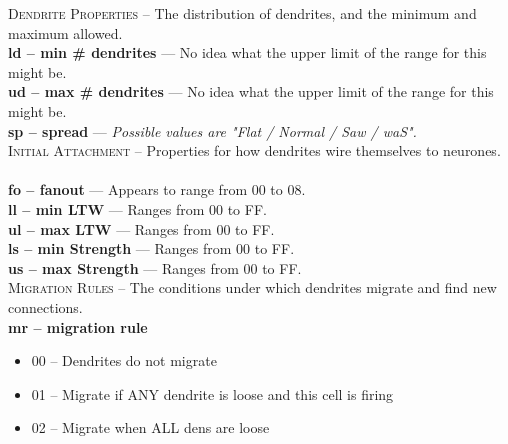 \documentclass[11pt,twoside,a4paper]{article}
\begin{document}
\textsc{Dendrite Properties} -- The distribution of dendrites, and the minimum and maximum allowed. ~\\

\textbf{ld -- min \# dendrites} --- No idea what the upper limit of the range for this might be. ~\\

\textbf{ud -- max \# dendrites} --- No idea what the upper limit of the range for this might be. ~\\

\textbf{sp -- spread} --- \emph{Possible values are "Flat / Normal / Saw / waS". } ~\\

\textsc{Initial Attachment} -- Properties for how dendrites wire themselves to neurones. ~\\

\textbf{fo -- fanout} --- Appears to range from 00 to 08. ~\\

\textbf{ll -- min LTW} --- Ranges from 00 to FF. ~\\

\textbf{ul -- max LTW} --- Ranges from 00 to FF. ~\\

\textbf{ls -- min Strength} --- Ranges from 00 to FF. ~\\

\textbf{us -- max Strength} --- Ranges from 00 to FF. ~\\

\textsc{Migration Rules} -- The conditions under which dendrites migrate and find new connections. ~\\

\textbf{mr -- migration rule}
\begin{itemize}
	\item 00 -- Dendrites do not migrate
	\item 01 -- Migrate if ANY dendrite is loose and this cell is firing
	\item 02 -- Migrate when ALL dens are loose
\end{itemize}

\clearpage
\end{document}
